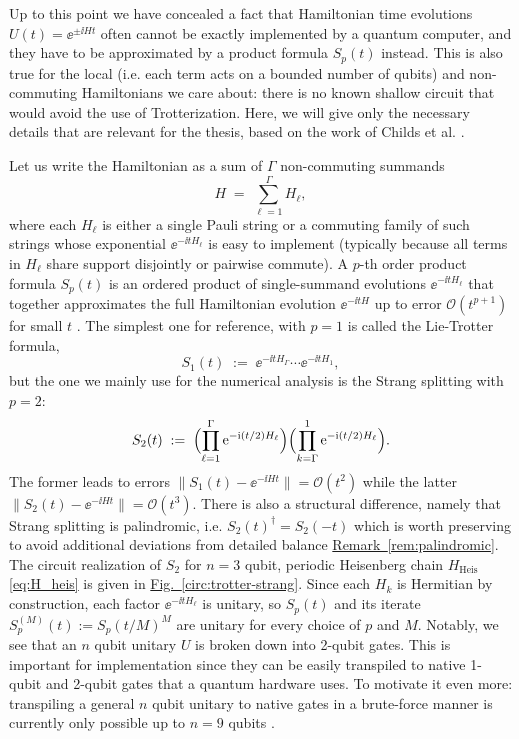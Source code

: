 Up to this point we have concealed a fact that Hamiltonian time evolutions $U(t) = \ee^{\pm \ii H t}$ often cannot be exactly implemented by a quantum computer, and they have to be approximated by a product formula $S_p(t)$ instead. This is also true for the local (i.e. each term acts on a bounded number of qubits) and non-commuting Hamiltonians we care about: there is no known shallow circuit that would avoid the use of Trotterization. Here, we will give only the necessary details that are relevant for the thesis, based on the work of Childs et al. \cite{childs2021theory}.

Let us write the Hamiltonian as a sum of $\Gamma$ non-commuting summands
$$
H \;=\; \sum_{\ell=1}^{\Gamma} H_\ell,
$$
where each $H_\ell$ is either a single Pauli string or a commuting family of such strings whose exponential $\ee^{-\ii t H_\ell}$ is easy to implement (typically because all terms in $H_\ell$ share support disjointly or pairwise commute). A $p$-th order product formula $S_p(t)$ is an ordered product of single-summand evolutions $\ee^{-\ii t H_\ell}$ that together approximates the full Hamiltonian evolution $\ee^{-\ii t H}$ up to error $\mathcal{O}(t^{p + 1})$ for small $t$ \cite{childs2021theory}. The simplest one for reference, with $p=1$ is called the Lie-Trotter formula, 
\begin{equation}
    S_1(t) \;:=\; \ee^{-\ii t H_\Gamma}\cdots \ee^{-\ii t H_1},
\end{equation}
but the one we mainly use for the numerical analysis is the Strang splitting with $p=2$:
\begin{equation}\label{eq:strang}
    S_2(t) \;:=\; \Bigl(\prod_{\ell=1}^{\Gamma} \mathrm{e}^{-\mathrm{i} (t/2) H_\ell}\Bigr)\Bigl(\prod_{k=\Gamma}^{1} \mathrm{e}^{-\mathrm{i} (t/2) H_\ell}\Bigr).
\end{equation}
The former leads to errors $\|S_1(t) - \ee^{-\ii H t}\| = \mathcal{O}(t^2)$ while the latter $\|S_2(t) - \ee^{-\ii H t}\| = \mathcal{O}(t^3)$. There is also a structural difference, namely that Strang splitting is palindromic, i.e. $S_2(t)^\dagger = S_2(-t)$ which is worth preserving to avoid additional deviations from detailed balance \hyperref[rem:palindromic]{Remark~\ref*{rem:palindromic}}. The circuit realization of $S_2$ for $n=3$ qubit, periodic Heisenberg chain $H_\mathrm{Heis}$ \eqref{eq:H_heis} is given in \hyperref[circ:trotter-strang]{Fig.~\ref*{circ:trotter-strang}}. Since each $H_k$ is Hermitian by construction, each factor $\ee^{-\ii t H_\ell}$ is unitary, so $S_p(t)$ and its iterate $S_p^{(M)}(t) := S_p(t/M)^M$ are unitary for every choice of $p$ and $M$. Notably, we see that an $n$ qubit unitary $U$ is broken down into 2-qubit gates. This is important for implementation since they can be easily transpiled to native 1-qubit and 2-qubit gates that a quantum hardware uses. To motivate it even more: transpiling a general $n$ qubit unitary to native gates in a brute-force manner is currently only possible up to $n = 9$ qubits \cite{rakyta2024highly}.

